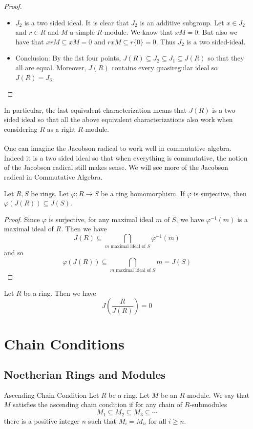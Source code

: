 \documentclass[a4paper]{article}
\begin{document}
\begin{thm}{}{}
\begin{proof}
\begin{itemize}
\item $J_2$ is a two sided ideal. It is clear that $J_2$ is an additive subgroup. Let $x\in J_2$ and $r\in R$ and $M$ a simple $R$-module. We know that $xM=0$. But also we have that $xrM\subseteq xM=0$ and $rxM\subseteq r\{0\}=0$. Thus $J_2$ is a two sided-ideal. 

\item Conclusion: By the fist four points, $J(R)\subseteq J_2\subseteq J_1\subseteq J(R)$ so that they all are equal. Moreover, $J(R)$ contains every quasiregular ideal so $J(R)=J_3$. 
\end{itemize}
\end{proof}
\end{thm}

In particular, the last equivalent characterization means that $J(R)$ is a two sided ideal so that all the above equivalent characterizations also work when considering $R$ as a right $R$-module. \\~\\

One can imagine the Jacobson radical to work well in commutative algebra. Indeed it is a two sided ideal so that when everything is commutative, the notion of the Jacobson radical still makes sense. We will see more of the Jacobson radical in Commutative Algebra. 

\begin{lmm}{}{} Let $R,S$ be rings. Let $\varphi:R\to S$ be a ring homomorphism. If $\varphi$ is surjective, then $\varphi(J(R))\subseteq J(S)$. \tcbline
\begin{proof}
Since $\varphi$ is surjective, for any maximal ideal $m$ of $S$, we have $\varphi^{-1}(m)$ is a maximal ideal of $R$. Then we have $$J(R)\subseteq\bigcap_{m\text{ maximal ideal of }S}\varphi^{-1}(m)$$ and so $$\varphi(J(R))\subseteq\bigcap_{m\text{ maximal ideal of }S}m=J(S)$$
\end{proof}
\end{lmm}

\begin{lmm}{}{} Let $R$ be a ring. Then we have $$J\left(\frac{R}{J(R)}\right)=0$$
\end{lmm}

\pagebreak
\section{Chain Conditions}
\subsection{Noetherian Rings and Modules}
\begin{defn}{Ascending Chain Condition}{} Let $R$ be a ring. Let $M$ be an $R$-module. We say that $M$ satisfies the ascending chain condition if for any chain of $R$-submodules $$M_1\subseteq M_2\subseteq M_3\subseteq\cdots$$ there is a positive integer $n$ such that $M_i=M_n$ for all $i\geq n$. 
\end{defn}
\end{document}
